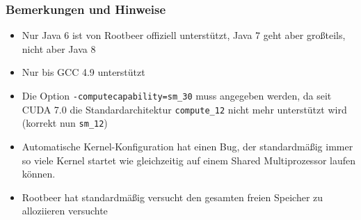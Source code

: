 \begin{frame}[fragile]
    \frametitle{Bemerkungen und Hinweise}
    \begin{itemize}
        \item Nur Java 6 ist von Rootbeer offiziell unterstützt, Java 7 geht aber großteils, nicht aber Java 8
        \item Nur bis GCC 4.9 unterstützt %
        \item Die Option \lstinline!-computecapability=sm_30! muss angegeben werden, da seit CUDA 7.0 die Standardarchitektur \lstinline!compute_12! nicht mehr unterstützt wird (korrekt nun \lstinline!sm_12!)
        \item Automatische Kernel-Konfiguration hat einen Bug, der standardmäßig immer so viele Kernel startet wie gleichzeitig auf einem Shared Multiprozessor laufen können.
        \item Rootbeer hat standardmäßig versucht den gesamten freien Speicher zu alloziieren versuchte

\end{itemize}
\end{frame}
